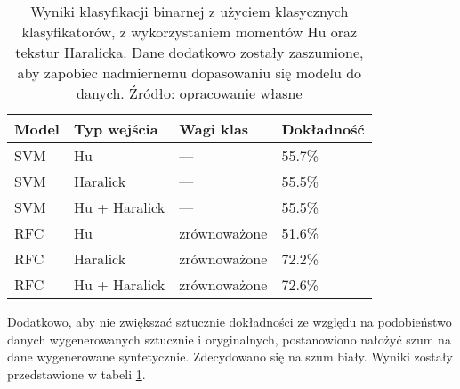 \begin{table}[h]
	\centering
	\begin{threeparttable}
		\caption{Wyniki klasyfikacji binarnej z użyciem klasycznych klasyfikatorów, z wykorzystaniem momentów Hu oraz tekstur Haralicka. Dane dodatkowo zostały zaszumione, aby zapobiec nadmiernemu dopasowaniu się modelu do danych. Źródło: opracowanie własne}
		\label{hu_haralick_table_with_augmentation_and_noise}
		\begin{tabularx}{1\textwidth}{ |X|X|X|X| }
		  \hline
		  \textbf{Model} & \textbf{Typ wejścia} & \textbf{Wagi klas} & \textbf{Dokładność}\\

		  \hline
		  SVM & Hu & — & 55.7\%\\

		  \hline
		  SVM & Haralick & — & 55.5\%\\

		  \hline
		  SVM & Hu + Haralick & — & 55.5\%\\

		  \hline
		  RFC & Hu & zrównoważone & 51.6\%\\

		  \hline
  		  RFC & Haralick & zrównoważone & 72.2\%\\
  		  
		  \hline
  		  RFC & Hu + Haralick & zrównoważone & 72.6\%\\
  		  
		  \hline
		\end{tabularx}
	\end{threeparttable}
\end{table}
Dodatkowo, aby nie zwiększać sztucznie dokładności ze względu na podobieństwo danych wygenerowanych sztucznie i oryginalnych, postanowiono nałożyć szum na dane wygenerowane syntetycznie. Zdecydowano się na szum biały. Wyniki zostały przedstawione w tabeli \ref{hu_haralick_table_with_augmentation_and_noise}.

